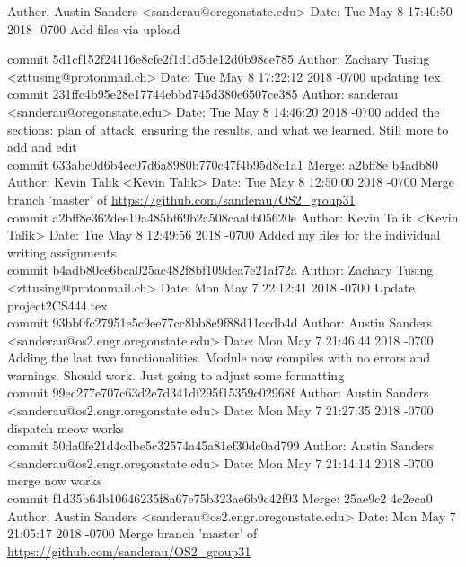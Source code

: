 \documentclass[onecolumn, draftclsnofoot,10pt, compsoc]{IEEEtran}
\begin{document}
        {\obeylines %
        Author: Austin Sanders <sanderau@oregonstate.edu>
Date:   Tue May 8 17:40:50 2018 -0700
Add files via upload

commit 5d1cf152f24116e8cfe2f1d1d5de12d0b98ce785
Author: Zachary Tusing <zttusing@protonmail.ch>
Date:   Tue May 8 17:22:12 2018 -0700
updating tex\\

commit 231ffc4b95e28e17744ebbd745d380e6507ce385
Author: sanderau <sanderau@oregonstate.edu>
Date:   Tue May 8 14:46:20 2018 -0700
added the sections: plan of attack, ensuring the results, and what we learned. Still more to add and edit\\

commit 633abc0d6b4ec07d6a8980b770c47f4b95d8c1a1
Merge: a2bff8e b4adb80
Author: Kevin Talik <Kevin Talik>
Date:   Tue May 8 12:50:00 2018 -0700
Merge branch 'master' of \url{https://github.com/sanderau/OS2_group31}\\

commit a2bff8e362dee19a485bf69b2a508caa0b05620e
Author: Kevin Talik <Kevin Talik>
Date:   Tue May 8 12:49:56 2018 -0700
Added my files for the individual writing assignments\\

commit b4adb80ce6bca025ac482f8bf109dea7e21af72a
Author: Zachary Tusing <zttusing@protonmail.ch>
Date:   Mon May 7 22:12:41 2018 -0700
Update project2CS444.tex\\

commit 93bb0fc27951e5c9ee77cc8bb8e9f88d11ccdb4d
Author: Austin Sanders <sanderau@os2.engr.oregonstate.edu>
Date:   Mon May 7 21:46:44 2018 -0700
Adding the last two functionalities. Module now compiles with no errors and warnings. Should work. Just going to adjust some formatting\\

commit 99ec277e707c63d2e7d341df295f15359c02968f
Author: Austin Sanders <sanderau@os2.engr.oregonstate.edu>
Date:   Mon May 7 21:27:35 2018 -0700
dispatch meow works\\

commit 50da0fe21d4cdbe5c32574a45a81ef30dc0ad799
Author: Austin Sanders <sanderau@os2.engr.oregonstate.edu>
Date:   Mon May 7 21:14:14 2018 -0700
merge now works\\

commit f1d35b64b10646235f8a67e75b323ae6b9c42f93
Merge: 25ae9c2 4c2eca0
Author: Austin Sanders <sanderau@os2.engr.oregonstate.edu>
Date:   Mon May 7 21:05:17 2018 -0700
Merge branch 'master' of \url{https://github.com/sanderau/OS2_group31}\\

}
\end{document}
